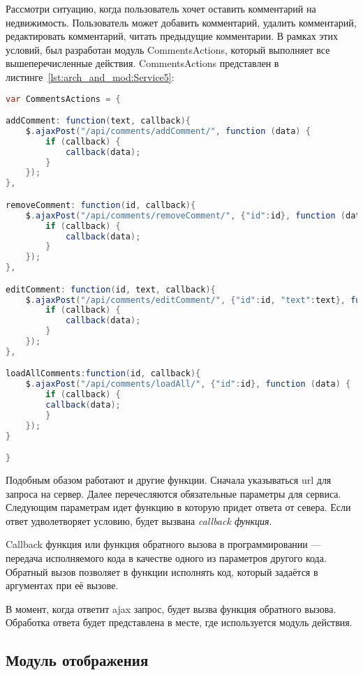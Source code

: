 Рассмотри ситуацию, когда пользователь хочет оставить комментарий на недвижимость. Пользователь может добавить комментарий, удалить комментарий, редактировать комментарий, читать предыдущие комментарии. В рамках этих условий, был разработан модуль CommentsActions, который выполняет все вышеперечисленные действия. CommentsActions представлен в листинге~\ref{lst:arch_and_mod:Service5}:

\begin{lstlisting}[language=Java, style=rubystyle, caption={Определение CommentsActions}, label=lst:arch_and_mod:Service5]
var CommentsActions = {

addComment: function(text, callback){
	$.ajaxPost("/api/comments/addComment/", function (data) {
		if (callback) {
			callback(data);
		}       
	});
},

removeComment: function(id, callback){
	$.ajaxPost("/api/comments/removeComment/", {"id":id}, function (data) {
		if (callback) {
			callback(data);
		}
	});
},

editComment: function(id, text, callback){
	$.ajaxPost("/api/comments/editComment/", {"id":id, "text":text}, function (data) {
		if (callback) {
			callback(data);
		}
	});
},

loadAllComments:function(id, callback){
	$.ajaxPost("/api/comments/loadAll/", {"id":id}, function (data) {
		if (callback) {
		callback(data);
		}
	});
}

}

\end{lstlisting}

Подобным обазом работают и другие функции. Сначала указываться url для запроса на сервер. Далее перечесляются обязательные параметры для сервиса. Следующим параметрам идет функцию в которую придет ответа от севера. Если ответ удволетворяет условию, будет вызвана \textit{callback функция}.

Callback функция или функция обратного вызова в программировании — передача исполняемого кода в качестве одного из параметров другого кода. Обратный вызов позволяет в функции исполнять код, который задаётся в аргументах при её вызове. 

В момент, когда ответит ajax запрос, будет вызва функция обратного вызова. Обработка ответа будет представлена в месте, где используется модуль действия. 

\subsection{Модуль отображения}

